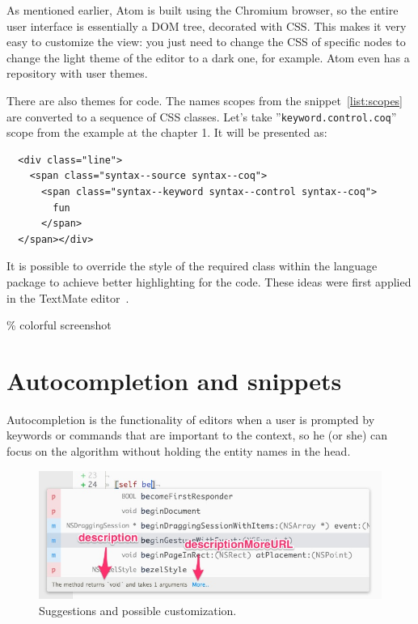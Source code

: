 As mentioned earlier, Atom is built using the Chromium browser, so the entire user interface is essentially a DOM tree, decorated with CSS. This makes it very easy to customize the view: you just need to change the CSS of specific nodes to change the light theme of the editor to a dark one, for example. Atom even has a repository with user themes.

There are also themes for code. The names scopes from the snippet~\ref{list:scopes} are converted to a sequence of CSS classes. Let's take ''\texttt{keyword.control.coq}'' scope from the example at the chapter 1. It will be presented as:\\

\begin{lstlisting}
  <div class="line">
    <span class="syntax--source syntax--coq">
      <span class="syntax--keyword syntax--control syntax--coq">
        fun
      </span>
  </span></div>
\end{lstlisting}
\vspace{1em}

It is possible to override the style of the required class within the language package to achieve better highlighting for the code. These ideas were first applied in the TextMate editor~\autocite{atom-grammar}.

















\newpage

\% colorful screenshot

\newpage

\section{Autocompletion and snippets}

Autocompletion is the functionality of editors when a user is prompted by keywords or commands that are important to the context, so he (or she) can focus on the algorithm without holding the entity names in the head. \\

\begin{figure}[H]
\centering
\includegraphics[width=\textwidth]{img/autocomplete.jpg}
\caption{\label{fig:autocomplete}Suggestions and possible customization.}
\end{figure}

